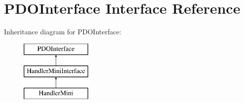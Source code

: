 \hypertarget{interface_pes_1_1_database_1_1_handler_1_1_mini_1_1_p_d_o_interface}{}\section{P\+D\+O\+Interface Interface Reference}
\label{interface_pes_1_1_database_1_1_handler_1_1_mini_1_1_p_d_o_interface}
Inheritance diagram for P\+D\+O\+Interface\+:\begin{figure}[H]
\begin{center}
\leavevmode
\includegraphics[height=3.000000cm]{interface_pes_1_1_database_1_1_handler_1_1_mini_1_1_p_d_o_interface}
\end{center}
\end{figure}
